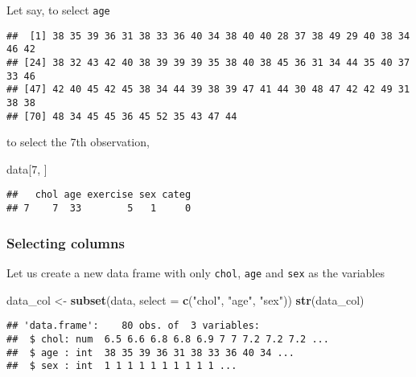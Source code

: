 \documentclass[]{book}
\newenvironment{Shaded}{\begin{snugshade}}{\end{snugshade}}
\newcommand{\KeywordTok}[1]{\textcolor[rgb]{0.13,0.29,0.53}{\textbf{{#1}}}}
\newcommand{\DataTypeTok}[1]{\textcolor[rgb]{0.13,0.29,0.53}{{#1}}}
\newcommand{\DecValTok}[1]{\textcolor[rgb]{0.00,0.00,0.81}{{#1}}}
\newcommand{\StringTok}[1]{\textcolor[rgb]{0.31,0.60,0.02}{{#1}}}
\newcommand{\NormalTok}[1]{{#1}}
\theoremstyle{definition}
\theoremstyle{definition}
\theoremstyle{remark}
\begin{document}
Let say, to select \texttt{age}

\begin{Shaded}
\end{Shaded}

\begin{verbatim}
##  [1] 38 35 39 36 31 38 33 36 40 34 38 40 40 28 37 38 49 29 40 38 34 46 42
## [24] 38 32 43 42 40 38 39 39 39 35 38 40 38 45 36 31 34 44 35 40 37 33 46
## [47] 42 40 45 42 45 38 34 44 39 38 39 47 41 44 30 48 47 42 42 49 31 38 38
## [70] 48 34 45 45 36 45 52 35 43 47 44
\end{verbatim}

to select the 7th observation,

\begin{Shaded}
\begin{Highlighting}[]
\NormalTok{data[}\DecValTok{7}\NormalTok{, ]}
\end{Highlighting}
\end{Shaded}

\begin{verbatim}
##   chol age exercise sex categ
## 7    7  33        5   1     0
\end{verbatim}

\subsubsection{Selecting columns}\label{selecting-columns}

Let us create a new data frame with only \texttt{chol}, \texttt{age} and
\texttt{sex} as the variables

\begin{Shaded}
\begin{Highlighting}[]
\NormalTok{data_col <-}\StringTok{ }\KeywordTok{subset}\NormalTok{(data, }\DataTypeTok{select =} \KeywordTok{c}\NormalTok{(}\StringTok{"chol"}\NormalTok{, }\StringTok{"age"}\NormalTok{, }\StringTok{"sex"}\NormalTok{))}
\KeywordTok{str}\NormalTok{(data_col)}
\end{Highlighting}
\end{Shaded}

\begin{verbatim}
## 'data.frame':    80 obs. of  3 variables:
##  $ chol: num  6.5 6.6 6.8 6.8 6.9 7 7 7.2 7.2 7.2 ...
##  $ age : int  38 35 39 36 31 38 33 36 40 34 ...
##  $ sex : int  1 1 1 1 1 1 1 1 1 1 ...
\end{verbatim}
\end{document}
